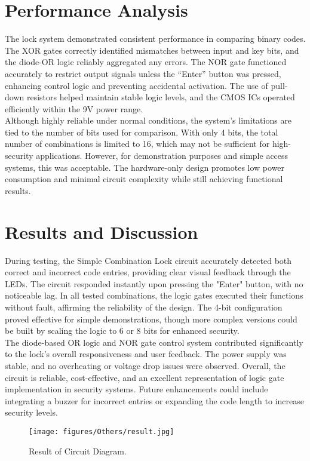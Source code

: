 \section{Performance Analysis}
The lock system demonstrated consistent performance in comparing binary codes. The XOR gates correctly identified mismatches between input and key bits, and the diode-OR logic reliably aggregated any errors. The NOR gate functioned accurately to restrict output signals unless the “Enter” button was pressed, enhancing control logic and preventing accidental activation. The use of pull-down resistors helped maintain stable logic levels, and the CMOS ICs operated efficiently within the 9V power range.\\
Although highly reliable under normal conditions, the system's limitations are tied to the number of bits used for comparison. With only 4 bits, the total number of combinations is limited to 16, which may not be sufficient for high-security applications. However, for demonstration purposes and simple access systems, this was acceptable. The hardware-only design promotes low power consumption and minimal circuit complexity while still achieving functional results.\cite{3.2}

\section{Results and Discussion}
During testing, the Simple Combination Lock circuit accurately detected both correct and incorrect code entries, providing clear visual feedback through the LEDs. The circuit responded instantly upon pressing the "Enter" button, with no noticeable lag. In all tested combinations, the logic gates executed their functions without fault, affirming the reliability of the design. The 4-bit configuration proved effective for simple demonstrations, though more complex versions could be built by scaling the logic to 6 or 8 bits for enhanced security.\\
The diode-based OR logic and NOR gate control system contributed significantly to the lock’s overall responsiveness and user feedback. The power supply was stable, and no overheating or voltage drop issues were observed. Overall, the circuit is reliable, cost-effective, and an excellent representation of logic gate implementation in security systems. Future enhancements could include integrating a buzzer for incorrect entries or expanding the code length to increase security levels.\cite{3.3}\\

\begin{figure}[H]

    \centering
    \texttt{[image: figures/Others/result.jpg]} %
    \caption{Result of Circuit Diagram.}
    \label{fig:sample}
\end{figure}